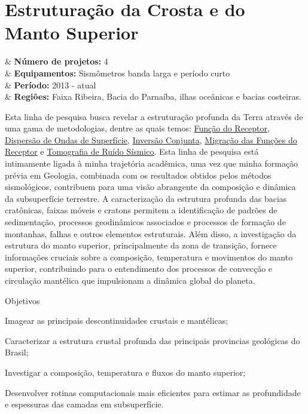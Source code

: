 \documentclass[10pt,a4paper,oneside]{book}
\begin{document}
\section{Estruturação da Crosta e do Manto Superior}

\begin{summarybox}[frametitle=\faProjectDiagram{}\quad Panorama da linha de pesquisa]
	\begin{datelist}
		\faFile* & \textbf{Número de projetos:} 4 \\
		\faBinoculars & \textbf{Equipamentos:} Sismômetros banda larga e período curto \\
		\faCalendar*[regular] & \textbf{Período:} 2013 - atual \\
		\faMapMarked* & \textbf{Regiões:} Faixa Ribeira, Bacia do Parnaíba, ilhas oceânicas e bacias costeiras. \\
	\end{datelist}
\end{summarybox}

\bigskip

Esta linha de pesquisa busca revelar a estruturação profunda da Terra através de uma gama de metodologias, dentre as quais temos: \href{https://doi.org/10.1029/JB084iB09p04749}{Função do Receptor}, \href{https://doi.org/10.1111/j.1365-246X.1990.tb04573.x}{Dispersão de Ondas de Superfície}, \href{https://doi.org/10.1046/j.1365-246x.2000.00217.x}{Inversão Conjunta}, \href{https://doi.org/10.1016/j.epsl.2013.08.025}{Migração das Funções do Receptor} e \href{https://doi.org/10.1111/j.1365-246X.2007.03374.x}{Tomografia de Ruído Sísmico}. Esta linha de pesquisa está intimamente ligada à minha trajetória acadêmica, uma vez que minha formação prévia em Geologia, combinada com os resultados obtidos pelos métodos sismológicos, contribuem para uma visão abrangente da composição e dinâmica da subsuperfície terrestre. A caracterização da estrutura profunda das bacias cratônicas, faixas móveis e cratons permitem a identificação de padrões de sedimentação, processos geodinâmicos associados e processos de formação de montanhas, falhas e outros elementos estruturais. Além disso, a investigação da estrutura do manto superior, principalmente da zona de transição, fornece informações cruciais sobre a composição, temperatura e movimentos do manto superior, contribuindo para o entendimento dos processos de convecção e circulação mantélica que impulsionam a dinâmica global do planeta.  

\begin{fancyenum}{\faFutbol}{Objetivos}
	\item Imagear as principais descontinuidades crustais e mantélicas;
	\item Caracterizar a estrutura crustal profunda das principais provincias geológicas do Brasil;
	\item Investigar a composição, temperatura e fluxos do manto superior;
	\item Desenvolver rotinas computacionais mais eficientes para estimar as profundidade e espessuras das camadas em subsuperfície.
\end{fancyenum}
\end{document}
